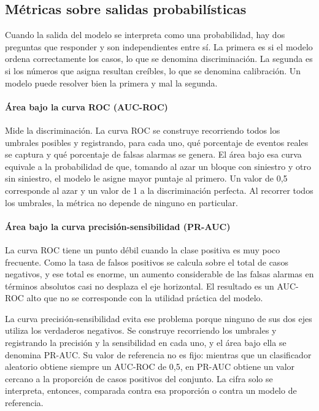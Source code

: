 \subsection{Métricas sobre salidas probabilísticas}

Cuando la salida del modelo se interpreta como una probabilidad, hay dos preguntas que responder y son independientes entre sí. La primera es si el modelo ordena correctamente los casos, lo que se denomina discriminación. La segunda es si los números que asigna resultan creíbles, lo que se denomina calibración. Un modelo puede resolver bien la primera y mal la segunda.

\paragraph{Área bajo la curva ROC (AUC-ROC)}

Mide la discriminación. La curva ROC se construye recorriendo todos los umbrales posibles y registrando, para cada uno, qué porcentaje de eventos reales se captura y qué porcentaje de falsas alarmas se genera. El área bajo esa curva equivale a la probabilidad de que, tomando al azar un bloque con siniestro y otro sin siniestro, el modelo le asigne mayor puntaje al primero. Un valor de 0,5 corresponde al azar y un valor de 1 a la discriminación perfecta. Al recorrer todos los umbrales, la métrica no depende de ninguno en particular.

\paragraph{Área bajo la curva precisión-sensibilidad (PR-AUC)}

La curva ROC tiene un punto débil cuando la clase positiva es muy poco frecuente. Como la tasa de falsos positivos se calcula sobre el total de casos negativos, y ese total es enorme, un aumento considerable de las falsas alarmas en términos absolutos casi no desplaza el eje horizontal. El resultado es un AUC-ROC alto que no se corresponde con la utilidad práctica del modelo.

La curva precisión-sensibilidad evita ese problema porque ninguno de sus dos ejes utiliza los verdaderos negativos. Se construye recorriendo los umbrales y registrando la precisión y la sensibilidad en cada uno, y el área bajo ella se denomina PR-AUC. Su valor de referencia no es fijo: mientras que un clasificador aleatorio obtiene siempre un AUC-ROC de 0,5, en PR-AUC obtiene un valor cercano a la proporción de casos positivos del conjunto. La cifra solo se interpreta, entonces, comparada contra esa proporción o contra un modelo de referencia.

